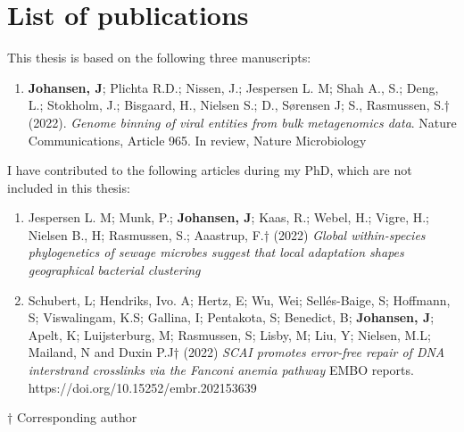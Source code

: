 \chapter{List of publications}
This thesis is based on the following three manuscripts: 

\begin{enumerate}[label=PAPER \Roman*.]


\item \textbf{Johansen, J}; Plichta R.D.; Nissen, J.; Jespersen L. M; Shah A., S.; Deng, L.; Stokholm, J.; Bisgaard, H., Nielsen S.; D., Sørensen J; S., Rasmussen, S.† (2022). \textit{Genome binning of viral entities from bulk metagenomics data}. Nature Communications, Article 965.
\newline
In review, Nature Microbiology
\end{enumerate}

\noindent
I have contributed to the following articles during my PhD, which are not included in this thesis:
\begin{enumerate}[label=PAPER \Roman*.]

\item Jespersen L. M; Munk, P.; \textbf{Johansen, J}; Kaas, R.; Webel, H.; Vigre, H.; Nielsen B., H; Rasmussen, S.; Aaastrup, F.† (2022)
\textit{Global within-species phylogenetics of sewage microbes suggest that local adaptation shapes geographical bacterial clustering}
\newline

\item Schubert, L; Hendriks, Ivo. A; Hertz, E; Wu, Wei; Sellés-Baige, S; Hoffmann, S; Viswalingam, K.S; Gallina, I; Pentakota, S; Benedict, B; \textbf{Johansen, J}; Apelt, K; Luijsterburg, M; Rasmussen, S; Lisby, M; Liu, Y; Nielsen, M.L; Mailand, N and Duxin P.J† (2022) \textit{SCAI promotes error-free repair of DNA interstrand crosslinks via the Fanconi anemia pathway}
EMBO reports. https://doi.org/10.15252/embr.202153639

\end{enumerate}

\noindent
† Corresponding author 